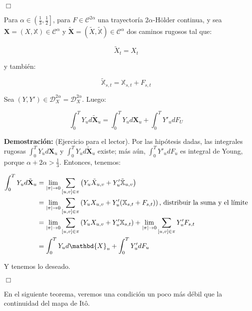 \begin{flushright}
	$\Box$
\end{flushright}


\begin{lema}
	Para $\alpha \in \left( \frac{1}{3}, \frac{1}{2} \right]$, para $F \in \mathcal{C}^{2 \alpha}$ una trayectoría $2 \alpha$-Hölder continua, y sea $\mathbf{X} = (X, \mathbb{X}) \in \mathscr{C}^{\alpha}$ y $\tilde{ \mathbf{X} } = (\tilde{X}, \tilde{ \mathbb{X} }) \in \mathscr{C}^{\alpha}$ dos caminos rugosos tal que:

	\[
		\tilde{X}_t = X_t
	\]

	y también:

	\[
		\tilde{ \mathbb{X}  }_{s,t} = \mathbb{X}_{s,t} + F_{s,t}
	\]

	Sea $(Y, Y') \in \mathscr{D}^{2 \alpha}_X = \mathscr{D}^{2 \alpha}_X$. Luego:

	\[
		\int_0^T Y_u d \tilde{ \mathbf{X} }_u = \int_0^T Y_u d \mathbf{X}_u + \int_0^T Y'_u dF_U
	\]


\end{lema}

\textbf{Demostración:} (Ejercicio para el lector). Por las hipótesis dadas, las integrales rugosas $\int_0^T Y_u d \mathbf{X}_u$ y $\int_0^T Y_u d \tilde{\mathbf{X}}_u$ existe; más aún, $\int_0^T Y'_u dF_u$ es integral de Young, porque $\alpha + 2\alpha > \frac{1}{3}$. Entonces, tenemos:

\begin{align*}
	\int_0^T Y_u d \tilde{ \mathbf{X} }_u &= \lim_{\lvert \pi \rvert \rightarrow 0} \sum_{ [u,v] \in \pi } \left( Y_u \tilde{X}_{u,v} + Y'_u \tilde{\mathbb{X}}_{u,v} \right) \\ 
	&= \lim_{\lvert \pi \rvert \rightarrow 0} \sum_{ [u,v] \in \pi } \left( Y_u X_{u,v} + Y'_u ( \mathbb{X}_{s,t} + F_{s,t} ) \right) \text{, distribuir la suma y el límite} \\
	&= \lim_{\lvert \pi \rvert \rightarrow 0} \sum_{ [u,v] \in \pi }  \left( Y_u X_{u,v} + Y'_u \mathbb{X}_{s,t} \right) + \lim_{\lvert \pi \rvert \rightarrow 0} \sum_{ [u,v] \in \pi } Y'_u  F_{s,t} \\
	&= \int_0^T Y_u d\mathbd{X}_u + \int_0^T Y'_u d F_u
\end{align*}

Y tenemos lo deseado. 

\begin{flushright}
	$\Box$
\end{flushright}

En el siguiente teorema, veremos una condición un poco más débil que la continuidad del mapa de Itô.

